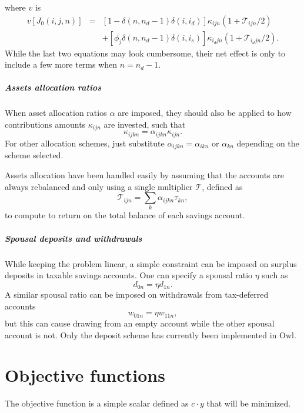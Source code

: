 \documentclass{report}[fleqn,11pt]
\begin{document}
where $v$ is
\begin{eqnarray}
	v[J_0(i, j, n)] 
	&=& [1 - \delta(n, n_d-1)\delta(i, i_d)] \kappa_{ijn}(1 + \mathcal{T}_{ijn}/2)
	\nonumber \\
	&& + [\phi_j\delta(n, n_d-1)\delta(i, i_s)]\kappa_{i_djn}(1 + \mathcal{T}_{i_djn}/2). 
\end{eqnarray}
While the last two equations may look cumbersome, their net effect is only to include
a few more terms when $n=n_d-1$. 

\paragraph*{Assets allocation ratios}
When asset allocation ratios $\alpha$ are imposed,
they should also be applied to how
contributions amounts $\kappa_{ijn}$ are invested, such that 
\begin{equation}
	\kappa_{ijkn} = \alpha_{ijkn} \kappa_{ijn}.
\end{equation}
For other allocation schemes, just substitute $\alpha_{ijkn} = \alpha_{ikn}$ or $\alpha_{kn}$
depending on the scheme selected.

Assets allocation have been handled easily by assuming that
the accounts are always rebalanced
and only using a single multiplier $\mathcal{T}$, defined as
\begin{equation}
	\mathcal{T}_{ijn} = \sum_k \alpha_{ijkn}\tau_{kn},
\end{equation}
to compute to return
on the total balance of each savings account.

\paragraph*{Spousal deposits and withdrawals}
While keeping the problem linear, a simple constraint can be imposed on
surplus deposits in taxable savings accounts. One can specify a spousal ratio $\eta$
such as
\begin{equation}
	d_{0n} = \eta d_{1n}.
\end{equation}
A similar spousal ratio can be imposed on withdrawals from tax-deferred accounts
\begin{equation}
	w_{01n} = \eta w_{11n},
\end{equation}
but this can cause drawing from an empty account while the other spousal account is not.
Only the deposit scheme has currently been implemented in Owl.

\chapter{Objective functions}
The objective function is a simple scalar defined as $c\cdot y$ that will be minimized.
\end{document}
